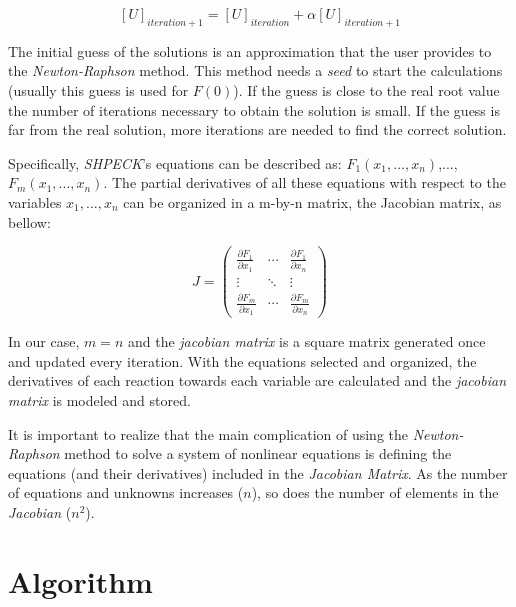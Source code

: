 \begin{equation}
\label{eq:CompositionCalculation}
[U]_{iteration+1} = [U]_{iteration} + \alpha [U]_{iteration+1}
\end{equation}

The initial guess of the solutions is an approximation that the user provides to the \emph{Newton-Raphson} method. This method needs a \emph{seed} to start the calculations (usually this guess is used for $F(0)$). 
If the guess is close to the real root value the number of iterations necessary to obtain the solution is small. If the guess is far from the real solution, more iterations are needed to find the correct solution.


Specifically, \emph{SHPECK}'s equations can be described as: $F_1(x_1,..., x_n)$,...,$F_m(x_1,...,x_n)$. The partial derivatives of all these equations with respect to the variables $x_1,...,x_n$ can be organized in a m-by-n matrix, the Jacobian matrix, as bellow:

\begin{equation} 
J =
 \begin{pmatrix}
  \frac{\partial F_1}{\partial x_1} & \cdots & \frac{\partial F_1}{\partial x_n} \\
  \vdots  & \ddots & \vdots  \\
  \frac{\partial F_m}{\partial x_1} & \cdots &   \frac{\partial F_m}{\partial x_n}
 \end{pmatrix}
\end{equation}


In our case, $m = n$ and the \emph{jacobian matrix} is a square matrix generated once and updated every iteration. With the equations selected and organized, the derivatives of each reaction towards each variable are calculated and the \emph{jacobian matrix} is modeled and stored. 


It is important to realize that the main complication of using the \emph{Newton-Raphson} method to solve a system of nonlinear equations is defining the equations (and their derivatives) included in the \emph{Jacobian Matrix}. As the number of equations and unknowns increases ($n$), so does the number of elements in the \emph{Jacobian} ($n^2$).


\section{Algorithm}


